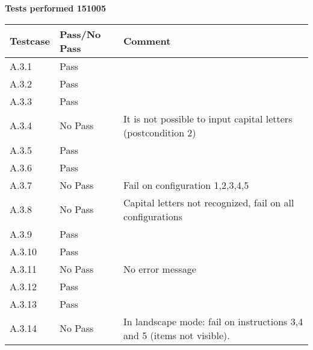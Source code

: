 \renewcommand{\testdate}{151005}
\textbf{ Tests performed \testdate}
\begin{center}
  	\begin{tabular}{| p{3cm} | p{5cm} | p{5cm} |}
    		\hline
	    	\textbf{Testcase}			& \textbf{Pass/No Pass} 	& \textbf{Comment} \\ \hline
    		A.3.1		 					& Pass  							&  				\\ \hline
    		A.3.2		 					& Pass 							& 				 \\	\hline
    		A.3.3		 					& Pass 							& 				 \\	\hline
    		A.3.4		 					& No Pass 					& It is not possible to input capital letters (postcondition 2)				 \\	\hline
    		A.3.5		 					& Pass 							& 				 \\	\hline
    		A.3.6		 					& Pass 							& 				 \\	\hline
    		A.3.7		 					& No Pass 							& Fail on configuration 1,2,3,4,5				 \\	\hline
    		A.3.8		 					& No Pass 							& Capital letters not recognized, fail on all configurations				 \\	\hline
    		A.3.9		 					& Pass 							& 				 \\	\hline
    		A.3.10	 						& Pass 							& 				 \\	\hline
    		A.3.11	 						& No Pass 							& No error message				 \\	\hline
    		A.3.12	 						& Pass 							& 				 \\	\hline
    		A.3.13	 						& Pass						& 				 \\	\hline
    		A.3.14	 						& No Pass 							& In landscape mode: fail on instructions 3,4 and 5 (items not visible).   				 \\	\hline
 	\end{tabular}
\end{center}